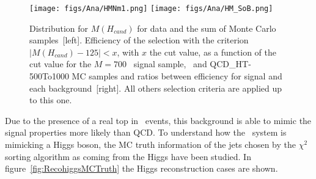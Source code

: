 \begin{figure}[!Hhtbp]
  \begin{center}
    \texttt{[image: figs/Ana/HMNm1.png]}
    \texttt{[image: figs/Ana/HM\_SoB.png]}
    \caption{Distribution for $M(H_{cand})$ for data and the sum of Monte Carlo samples~[left]. Efficiency of the selection with the criterion $|M(H_{cand})-125|<x$, with $x$ the cut value, as a function of the cut value for the $M=700$ \GeVcc~signal sample, \ttbar~and QCD\_HT-500To1000 MC samples and ratios between efficiency for signal and each background~[right]. All others selection criteria are applied up to this one.}
    \label{fig:HiggsMassDMC}
  \end{center}
\end{figure}

Due to the presence of a real top in \ttbar~events, this background is able to mimic the signal properties more likely than QCD. To understand how the \ttbar~system is mimicking a Higgs boson, the MC truth information of the jets chosen by the $\chi^{2}$ sorting algorithm as coming from the Higgs have been studied. In figure~\ref{fig:RecohiggsMCTruth} the Higgs reconstruction cases are shown. %


